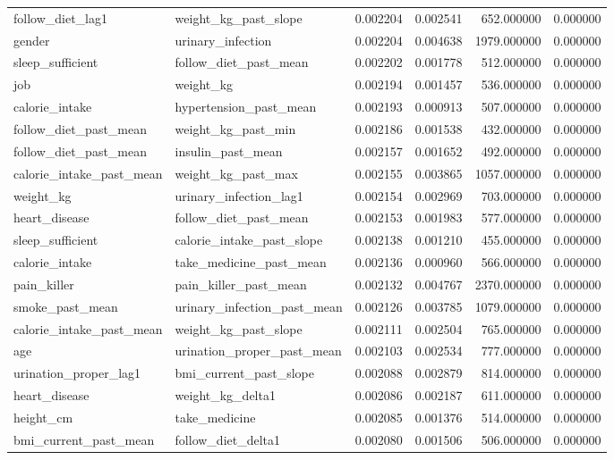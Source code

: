 \begin{longtable}{llrrrr}
follow\_diet\_lag1 & weight\_kg\_past\_slope & 0.002204 & 0.002541 & 652.000000 & 0.000000 \\
gender & urinary\_infection & 0.002204 & 0.004638 & 1979.000000 & 0.000000 \\
sleep\_sufficient & follow\_diet\_past\_mean & 0.002202 & 0.001778 & 512.000000 & 0.000000 \\
job & weight\_kg & 0.002194 & 0.001457 & 536.000000 & 0.000000 \\
calorie\_intake & hypertension\_past\_mean & 0.002193 & 0.000913 & 507.000000 & 0.000000 \\
follow\_diet\_past\_mean & weight\_kg\_past\_min & 0.002186 & 0.001538 & 432.000000 & 0.000000 \\
follow\_diet\_past\_mean & insulin\_past\_mean & 0.002157 & 0.001652 & 492.000000 & 0.000000 \\
calorie\_intake\_past\_mean & weight\_kg\_past\_max & 0.002155 & 0.003865 & 1057.000000 & 0.000000 \\
weight\_kg & urinary\_infection\_lag1 & 0.002154 & 0.002969 & 703.000000 & 0.000000 \\
heart\_disease & follow\_diet\_past\_mean & 0.002153 & 0.001983 & 577.000000 & 0.000000 \\
sleep\_sufficient & calorie\_intake\_past\_slope & 0.002138 & 0.001210 & 455.000000 & 0.000000 \\
calorie\_intake & take\_medicine\_past\_mean & 0.002136 & 0.000960 & 566.000000 & 0.000000 \\
pain\_killer & pain\_killer\_past\_mean & 0.002132 & 0.004767 & 2370.000000 & 0.000000 \\
smoke\_past\_mean & urinary\_infection\_past\_mean & 0.002126 & 0.003785 & 1079.000000 & 0.000000 \\
calorie\_intake\_past\_mean & weight\_kg\_past\_slope & 0.002111 & 0.002504 & 765.000000 & 0.000000 \\
age & urination\_proper\_past\_mean & 0.002103 & 0.002534 & 777.000000 & 0.000000 \\
urination\_proper\_lag1 & bmi\_current\_past\_slope & 0.002088 & 0.002879 & 814.000000 & 0.000000 \\
heart\_disease & weight\_kg\_delta1 & 0.002086 & 0.002187 & 611.000000 & 0.000000 \\
height\_cm & take\_medicine & 0.002085 & 0.001376 & 514.000000 & 0.000000 \\
bmi\_current\_past\_mean & follow\_diet\_delta1 & 0.002080 & 0.001506 & 506.000000 & 0.000000 \\

\end{longtable}

